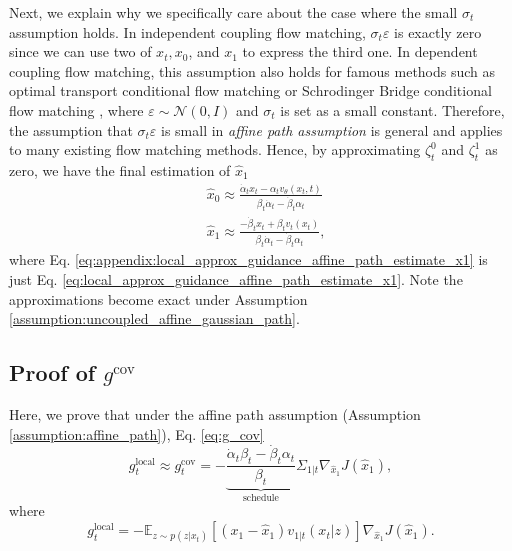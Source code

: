 Next, we explain why we specifically care about the case where the small $\sigma_t$ assumption holds.
In independent coupling flow matching, $\sigma_t\varepsilon$ is exactly zero since we can use two of $x_t,x_0$, and $x_1$ to express the third one. In dependent coupling flow matching, this assumption also holds for famous methods such as optimal transport conditional flow matching or Schrodinger Bridge conditional flow matching \cite{tong_improving_2024}, where $\varepsilon\sim\mathcal{N}(0,I)$ and $\sigma_t$ is set as a small constant. Therefore, the assumption that $\sigma_t\varepsilon$ is small in \emph{affine path assumption} is general and applies to many existing flow matching methods. Hence, by approximating $\zeta_t^0$ and $\zeta_t^1$ as zero, we have the final estimation of $\hat{x}_1$
\begin{align}
    &\hat{x}_0 \approx 
    \frac{\dot\alpha_t x_t - \alpha_t v_\theta(x_t,t)}{\beta_t\dot\alpha_t - \dot\beta_t\alpha_t} \\
    &\label{eq:appendix:local_approx_guidance_affine_path_estimate_x1}\hat{x}_1 \approx 
    \frac{-\dot\beta_t x_t + \beta_t v_t(x_t)}{\beta_t\dot\alpha_t - \dot\beta_t\alpha_t},
\end{align}
where Eq. \eqref{eq:appendix:local_approx_guidance_affine_path_estimate_x1} is just Eq. \eqref{eq:local_approx_guidance_affine_path_estimate_x1}. Note the approximations become exact under Assumption \ref{assumption:uncoupled_affine_gaussian_path}.


\subsection{Proof of $g^{\text{cov}}$}
\label{appendix:affine_path_cov_local_approx_guidance}
Here, we prove that under the affine path assumption (Assumption \ref{assumption:affine_path}), Eq. \eqref{eq:g_cov}
\begin{equation}\label{eq:restate_g_cov}
    g_t^{\text{local}}\approx g_t^{\text{cov}} = -\underbrace{\frac{\dot\alpha_t\beta_t - \dot\beta_t\alpha_t}{\beta_t}}_{\text{schedule}} \Sigma_{1|t} \nabla_{\hat{x}_1}J(\hat{x}_1),
\end{equation}
where 
\begin{equation}
    g_t^{\text{local}} = -\mathbb{E}_{z \sim p(z|x_t)}
    \left[
     (x_1 - \hat{x}_1)v_{1|t}(x_t|z)
    \right] \nabla_{\hat{x}_1} J(\hat{x}_1).
\end{equation}

